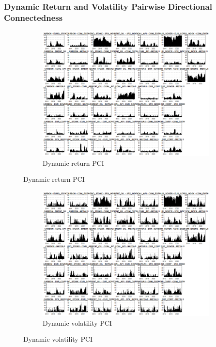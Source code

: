 \documentclass[preprint, 3p,
authoryear]{elsarticle} %
\begin{document}
\begin{landscape}
\newpage

\subsubsection{Dynamic Return and Volatility Pairwise Directional Connectedness}

\begin{figure}[!ht]
  \caption{Dynamic Return and Volatility Pairwise Connectedness Index (Jan 2013 – Jan 2025)}
  \centering
  \begin{subfigure}[a]{\textwidth}
    \caption{Dynamic return PCI}
    \includegraphics[width = 1.1\linewidth]{19aApdxD-8-200-RetPCI}
  \end{subfigure}
\end{figure}
\begin{figure}[!ht]
  \ContinuedFloat
  \centering
    \begin{subfigure}[b]{\textwidth}\ContinuedFloat
      \caption{Dynamic volatility PCI}
      \includegraphics[width = 1.2\linewidth]{19bApdxD-8-200-VolPCI}
    \end{subfigure}
\end{figure}









\end{landscape}
\end{document}
